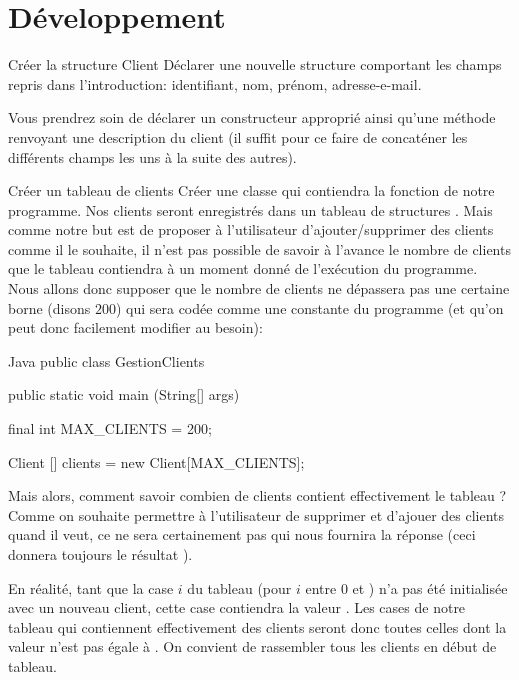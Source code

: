 \documentclass[a4paper,11pt]{article}
\begin{document}
\newpage 

\section{D\'eveloppement}


 	\begin{Exercice}{Créer la structure Client}
		D\'eclarer une nouvelle structure  comportant les champs repris dans l'introduction: identifiant, nom, prénom, adresse-e-mail.
		
		Vous prendrez soin de d\'eclarer un constructeur appropri\'e ainsi qu'une m\'ethode  renvoyant une description du client (il suffit pour ce faire de concat\'ener les diff\'erents champs les uns \`a la suite des autres).
		
	\end{Exercice} 

 
 	\begin{Exercice}{Cr\'eer un tableau de clients}
	Cr\'eer une classe  qui contiendra la fonction  de notre programme. Nos clients seront enregistr\'es dans un tableau de structures . Mais comme notre but est de proposer \`a l'utilisateur d'ajouter/supprimer des clients comme il le souhaite, il n'est pas possible de savoir \`a l'avance le nombre de clients que le tableau contiendra \`a un moment donn\'e de l'ex\'ecution du programme. Nous allons donc supposer que le nombre de clients ne dépassera pas une certaine borne (disons $200$) qui sera cod\'ee comme une constante du programme (et qu'on peut donc facilement modifier au besoin):
	
		\begin{Code}{Java} 
			public class GestionClients
			{	
				public static void main (String[] args)
				{
				        final int MAX_CLIENTS = 200;
				        				
				        Client [] clients = new Client[MAX_CLIENTS];
				}
			}
		\end{Code}
Mais alors, comment savoir combien de clients contient effectivement le tableau ? Comme on souhaite permettre \`a l'utilisateur de supprimer et d'ajouer des clients quand il veut, ce ne sera certainement pas  qui nous fournira la réponse (ceci donnera toujours le r\'esultat ).

En réalité, tant que la case $i$ du tableau (pour $i$ entre $0$ et ) n'a pas été initialisée avec un nouveau client, cette case contiendra la valeur . Les cases de notre tableau qui contiennent effectivement des clients seront donc toutes celles dont la valeur n'est pas égale à . On convient de rassembler tous les clients en d\'ebut de tableau.
\end{Exercice}	
\end{document}
